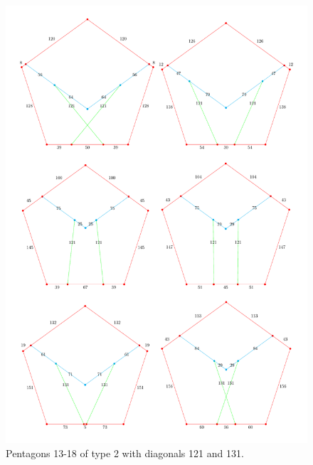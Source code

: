 \documentclass[11pt]{article}
\begin{document}
\begin{figure}
\centering
\includegraphics[width=16cm]{types/2gen-c}
\caption{Pentagons 13-18 of type 2 with diagonals 121 and 131.}
\label{2gen-b}
\end{figure}
\end{document}
